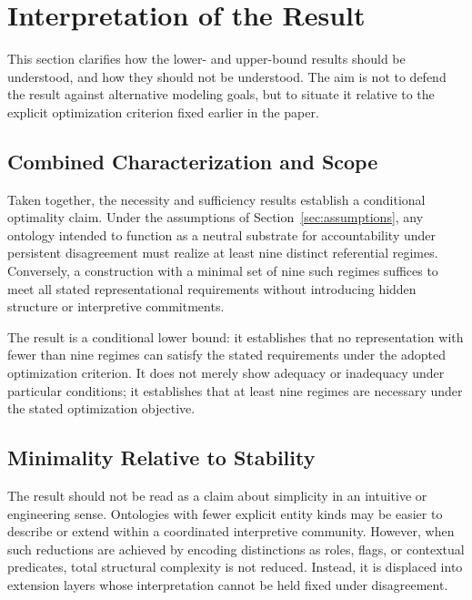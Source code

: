 
\section{Interpretation of the Result}
\label{sec:interpretation}

This section clarifies how the lower- and upper-bound results should be
understood, and how they should not be understood.
The aim is not to defend the result against alternative modeling goals,
but to situate it relative to the explicit optimization criterion fixed
earlier in the paper.

\subsection{Combined Characterization and Scope}

Taken together, the necessity and sufficiency results establish a
conditional optimality claim.
Under the assumptions of Section~\ref{sec:assumptions},
any ontology intended to function as a neutral substrate
for accountability under persistent disagreement
must realize at least nine distinct referential regimes.
Conversely, a construction with a minimal set of nine such regimes suffices to meet
all stated representational requirements without introducing hidden
structure or interpretive commitments.

The result is a conditional lower bound:
it establishes that no representation with fewer than
nine regimes can satisfy the stated requirements
 under the adopted optimization criterion.
It does not merely show adequacy or inadequacy
under particular conditions;
it establishes that at least nine regimes are necessary
under the stated optimization objective.

\subsection{Minimality Relative to Stability}

The result should not be read as a claim about simplicity in an intuitive
or engineering sense.
Ontologies with fewer explicit entity kinds may be easier to describe or extend
within a coordinated interpretive community.
However, when such reductions are achieved by encoding \stabilitycritical{}
distinctions as roles, flags, or contextual predicates, total structural
complexity is not reduced.
Instead, it is displaced into extension layers whose interpretation cannot
be held fixed under disagreement.


